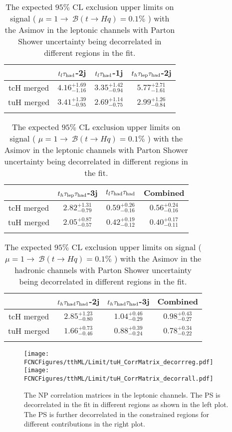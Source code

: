 \begin{table}
\centering
\begin{tabular}{cccc} \toprule\toprule
 & $t_l\tau_\text{had}$-2j & $t_l\tau_\text{had}$-1j & $t_h\tau_\text{lep}{}\tau_\text{had}$-2j\\\midrule
tcH merged & $4.16^{+1.69}_{-1.16}$ & $3.35^{+1.42}_{-0.94}$ & $5.77^{+2.71}_{-1.61}$\\
tuH merged & $3.41^{+1.39}_{-0.95}$ & $2.69^{+1.14}_{-0.75}$ & $2.99^{+1.26}_{-0.84}$\\
\bottomrule\bottomrule\\
\end{tabular}
\begin{tabular}{cccc} \toprule\toprule
 & $t_h\tau_\text{lep}{}\tau_\text{had}$-3j & $t_l\tau_\text{had}{}\tau_\text{had}$ & Combined\\\midrule
tcH merged & $2.82^{+1.31}_{-0.79}$ & $0.59^{+0.26}_{-0.16}$ & $0.56^{+0.24}_{-0.16}$\\
tuH merged & $2.05^{+0.87}_{-0.57}$ & $0.42^{+0.19}_{-0.12}$ & $0.40^{+0.17}_{-0.11}$\\
\bottomrule\bottomrule\\
\end{tabular}
\caption{The expected $95\%$ CL exclusion upper limits on signal ( $\mu=1\to~\mathcal{B}(t\to Hq)=0.1\%$ ) with the Asimov in the leptonic channels with Parton Shower uncertainty being decorrelated in different regions in the fit.} 
\label{tab:tthML_deco_limit}
\end{table}



\begin{table}
\centering
\begin{tabular}{cccc} \toprule\toprule
 & $t_h\tau_\text{had}{}\tau_\text{had}$-2j & $t_h\tau_\text{had}{}\tau_\text{had}$-3j & Combined\\\midrule
tcH merged & $2.85^{+1.23}_{-0.80}$ & $1.04^{+0.46}_{-0.29}$ & $0.98^{+0.43}_{-0.27}$\\
tuH merged & $1.66^{+0.73}_{-0.46}$ & $0.88^{+0.39}_{-0.24}$ & $0.78^{+0.34}_{-0.22}$\\
\bottomrule\bottomrule\\
\end{tabular}
\caption{The expected $95\%$ CL exclusion upper limits on signal ( $\mu=1\to~\mathcal{B}(t\to Hq)=0.1\%$ ) with the Asimov in the hadronic channels with Parton Shower uncertainty being decorrelated in different regions in the fit.} 
\label{tab:xTFW_deco_limit}
\end{table}




\begin{figure}[H]
\centering
\texttt{[image: \\FCNCFigures/tthML/Limit/tuH\_CorrMatrix\_decorrreg.pdf]}
\texttt{[image: \\FCNCFigures/tthML/Limit/tuH\_CorrMatrix\_decorrall.pdf]}
\caption{ The NP correlation matrices in the leptonic channels. The PS is decorrelated in the fit in different regions as shown in the left plot. The PS is further decorrelated in the constrained regions for different contributions in the right plot. }
\label{fig:tuH_CorrMatrix_decorr}
\end{figure}

